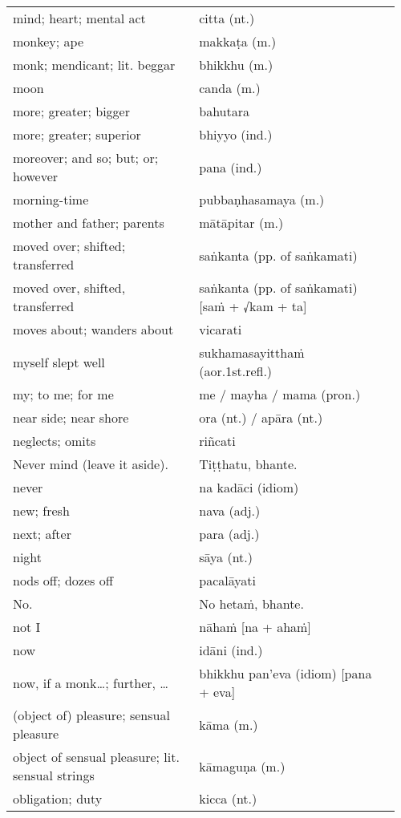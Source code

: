 \documentclass[a5paper]{memoir}
\begin{document}
\begin{longtable}{L{0.48\linewidth} L{0.48\linewidth} H}
mind; heart; mental act & citta (nt.) & \\[0pt]
monkey; ape & makkaṭa (m.) & \\[0pt]
monk; mendicant; lit. beggar & bhikkhu (m.) & \\[0pt]
moon & canda (m.) & \\[0pt]
more; greater; bigger & bahutara & \\[0pt]
more; greater; superior & bhiyyo (ind.) & \\[0pt]
moreover; and so; but; or; however & pana (ind.) & \\[0pt]
morning-time & pubbaṇhasamaya (m.) & \\[0pt]
mother and father; parents & mātāpitar (m.) & \\[0pt]
moved over; shifted; transferred & saṅkanta (pp. of saṅkamati) & \\[0pt]
moved over, shifted, transferred & saṅkanta (pp. of saṅkamati) [saṁ + √kam + ta] & \\[0pt]
moves about; wanders about & vicarati & \\[0pt]
myself slept well & sukhamasayitthaṁ (aor.1st.refl.) & \\[0pt]
my; to me; for me & me / mayha / mama (pron.) & \\[0pt]
near side; near shore & ora (nt.) / apāra (nt.) & \\[0pt]
neglects; omits & riñcati & \\[0pt]
Never mind (leave it aside). & Tiṭṭhatu, bhante. & \\[0pt]
never & na kadāci (idiom) & \\[0pt]
new; fresh & nava (adj.) & \\[0pt]
next; after & para (adj.) & \\[0pt]
night & sāya (nt.) & \\[0pt]
nods off; dozes off & pacalāyati & \\[0pt]
No. & No hetaṁ, bhante. & \\[0pt]
not I & nāhaṁ [na + ahaṁ] & \\[0pt]
now & idāni (ind.) & \\[0pt]
now, if a monk\ldots{}; further, \ldots{} & bhikkhu pan'eva (idiom) [pana + eva] & \\[0pt]
(object of) pleasure; sensual pleasure & kāma (m.) & \\[0pt]
object of sensual pleasure; lit. sensual strings & kāmaguṇa (m.) & \\[0pt]
obligation; duty & kicca (nt.) & \\[0pt]

\end{longtable}
\end{document}
